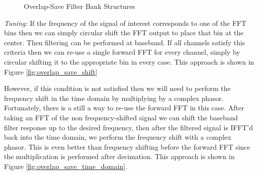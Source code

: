 \documentclass[12pt]{report}
\begin{document}
\begin{figure}[h!]
\centerline{
    \hfill
}
\caption{Overlap-Save Filter Bank Structures}
\label{fig:overlap_save_filter_banks}
\end{figure}

\emph{Tuning:} If the frequency of the signal of interest corresponds to one of
the FFT bins then we can simply circular shift the FFT output to place that bin
at the center. Then filtering can be performed at baseband.  If all channels
satisfy this criteria then we can re-use a single forward FFT for every
channel, simply by circular shifting it to the appropriate bin in every case. 
This approach is shown in Figure \ref{fig:overlap_save_shift}

However, if this condition is not satisfied then we will need to perform the
frequency shift in the time domain by multiplying by a complex phasor.
Fortunately, there is a still a way to re-use the forward FFT in this case.
After taking an FFT of the non frequency-shifted signal we can shift the
baseband filter response up to the desired frequency, then after the filtered
signal is IFFT'd back into the time domain, we perform the frequency shift with
a complex phasor.  This is even better than frequency shifting before the
forward FFT since the multiplication is performed after decimation. This
approach is shown in Figure \ref{fig:overlap_save_time_domain}.
\end{document}
